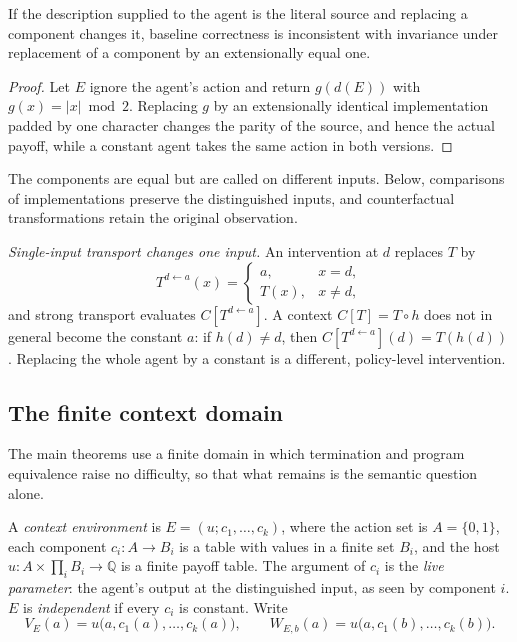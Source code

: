 \begin{proposition}\label{prop:rawsource}
If the description supplied to the agent is the literal source and replacing a component changes it,
baseline correctness is inconsistent with invariance under replacement of a component by an
extensionally equal one.
\end{proposition}

\begin{proof}
Let $E$ ignore the agent's action and return $g(d(E))$ with $g(x)=|x|\bmod2$. Replacing $g$ by an
extensionally identical implementation padded by one character changes the parity of the source,
and hence the actual payoff, while a constant agent takes the same action in both versions.
\end{proof}

The components are equal but are called on different inputs. Below, comparisons of implementations
preserve the distinguished inputs, and counterfactual transformations retain the original
observation.

\emph{Single-input transport changes one input.} An intervention at $d$ replaces $T$ by
\[
  T^{d\leftarrow a}(x)=\begin{cases}a,&x=d,\\T(x),&x\ne d,\end{cases}
\]
and strong transport evaluates $C[T^{d\leftarrow a}]$. A context $C[T]=T\circ h$ does not in general
become the constant $a$: if $h(d)\neq d$, then $C[T^{d\leftarrow a}](d)=T(h(d))$. Replacing the whole agent
by a constant is a different, policy-level intervention.

\subsection{The finite context domain}

The main theorems use a finite domain in which termination and program equivalence raise no
difficulty, so that what remains is the semantic question alone.

\begin{definition}\label{def:context}
A \emph{context environment} is $E=(u;c_1,\dots,c_k)$, where the action set is $A=\{0,1\}$, each
component $c_i\colon A\to B_i$ is a table with values in a finite set $B_i$, and the host
$u\colon A\times\prod_iB_i\to\mathbb Q$ is a finite payoff table. The argument of $c_i$ is the
\emph{live parameter}: the agent's output at the distinguished input, as seen by component $i$. $E$ is
\emph{independent} if every $c_i$ is constant. Write
\[
  V_E(a)=u\bigl(a,c_1(a),\dots,c_k(a)\bigr),\qquad
  W_{E,b}(a)=u\bigl(a,c_1(b),\dots,c_k(b)\bigr).
\]
\end{definition}


